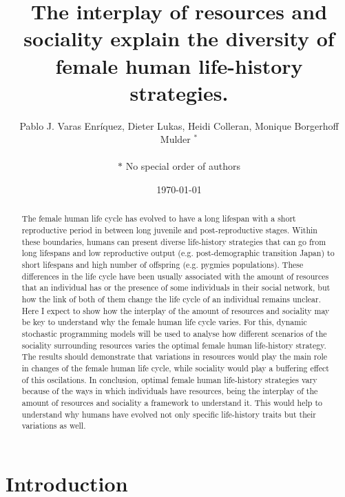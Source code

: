 \documentclass{article}
\title{The interplay of resources and sociality explain the diversity of female human life-history strategies.}
\author{Pablo J. Varas Enríquez, Dieter Lukas, Heidi Colleran, Monique Borgerhoff Mulder $^*$\\\\
$*$ No special order of authors}
\date{\today}
\begin{document}
\maketitle

\tableofcontents

\begin{abstract}
    The female human life cycle has evolved to have a long lifespan with a short reproductive period in between long juvenile and post-reproductive stages. Within these boundaries, humans can present diverse life-history strategies that can go from long lifespans and low reproductive output (e.g. post-demographic transition Japan) to short lifespans and high number of offspring (e.g. pygmies populations). These differences in the life cycle have been usually associated with the amount of resources that an individual has or the presence of some individuals in their social network, but how the link of both of them change the life cycle of an individual remains unclear. Here I expect to show how the interplay of the amount of resources and sociality may be key to understand why the female human life cycle varies. For this, dynamic stochastic programming models will be used to analyse how different scenarios of the sociality surrounding resources varies the optimal female human life-history strategy. The results should demonstrate that variations in resources would play the main role in changes of the female human life cycle, while sociality would play a buffering effect of this oscilations. In conclusion, optimal female human life-history strategies vary because of the ways in which individuals have resources, being the interplay of the amount of resources and sociality a framework to understand it. This would help to understand why humans have evolved not only specific life-history traits but their variations as well.
\end{abstract}

\section{Introduction}
\end{document}
